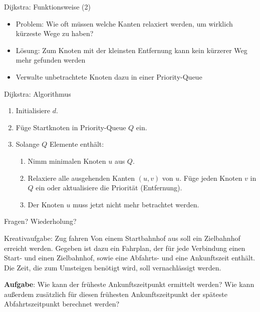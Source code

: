 \begin{frame}{Dijkstra: Funktionsweise (2)}
	\begin{itemize}
		\item Problem: Wie oft müssen welche Kanten relaxiert werden, um wirklich kürzeste Wege zu haben?
		\item Lösung: Zum Knoten mit der kleinsten Entfernung kann kein kürzerer Weg mehr gefunden werden
		\item Verwalte unbetrachtete Knoten dazu in einer Priority-Queue
	\end{itemize}
\end{frame}

\begin{frame}{Dijkstra: Algorithmus}
	\begin{enumerate}
		\item Initialisiere $d$.
		\item Füge Startknoten in Priority-Queue $Q$ ein.
		\item Solange $Q$ Elemente enthält:
			\begin{enumerate}
				\item Nimm minimalen Knoten $u$ aus $Q$.
				\item Relaxiere alle ausgehenden Kanten $(u, v)$ von $u$. Füge jeden Knoten $v$ in $Q$ ein oder aktualisiere die Priorität (Entfernung).
				\item Der Knoten $u$ muss jetzt nicht mehr betrachtet werden.
			\end{enumerate}
	\end{enumerate}
\end{frame}

\begin{frame}
	\begin{center}
		\Huge
		Fragen? Wiederholung?
	\end{center}
\end{frame}

\begin{frame}{Kreativaufgabe: Zug fahren}
	Von einem Startbahnhof aus soll ein Zielbahnhof erreicht werden.
	Gegeben ist dazu ein Fahrplan, der für jede Verbindung einen Start- und einen Zielbahnhof, sowie eine Abfahrts- und eine Ankunftszeit enthält.
	Die Zeit, die zum Umsteigen benötigt wird, soll vernachlässigt werden.

	\textbf{Aufgabe}: Wie kann der früheste Ankunftszeitpunkt ermittelt werden? Wie kann außerdem zusätzlich für diesen frühesten Ankunftszeitpunkt der späteste Abfahrtszeitpunkt berechnet werden?
\end{frame}

